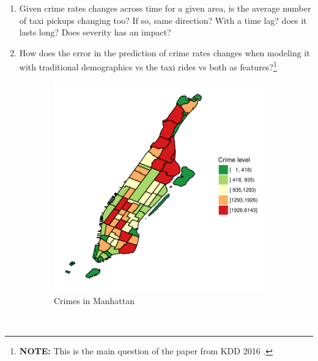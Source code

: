 \documentclass{sigkddExp}
\begin{document}
\begin{enumerate}
       \item Given crime rates changes across time for a given area, is the average number of taxi pickups  changing too? If so, same direction? With a time lag?
       does it lasts long? Does severity has an impact?

       \item How does the error in the prediction of crime rates changes when modeling it with traditional demographics vs the taxi rides vs both as features?\footnote{
       \textbf{NOTE:} This is the main question of the paper from KDD 2016 \cite{Wang16}. }

\end{enumerate}

\begin{figure}
    \centering
    \begin{subfigure}[t]{0.5\textwidth}
        \centering
        \includegraphics[width=.9\textwidth]{../img/crimes_per_zone_2015_Manhattan}
        \caption{Crimes in Manhattan}
    \end{subfigure}%
    ~ 
    \begin{subfigure}[t]{0.5\textwidth}
        \centering

\end{subfigure}
\end{figure}
\end{document}
